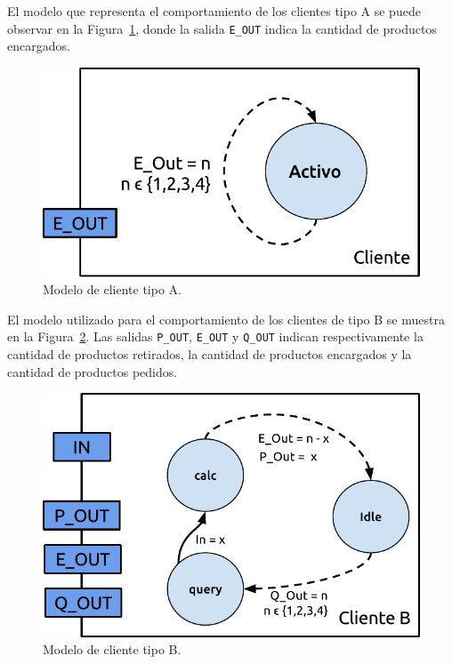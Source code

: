 \documentclass[10pt]{article}
\begin{document}
El modelo que representa el comportamiento de los clientes tipo A se puede observar en la Figura~\ref{fig:fig2}, donde la salida \texttt{E\_OUT} indica la cantidad de productos encargados.

\begin{figure}
\centering
\includegraphics[scale=1]{img/figura2}
\caption{Modelo de cliente tipo A.}
\label{fig:fig2}
\end{figure}

El modelo utilizado para el comportamiento de los clientes de tipo B se muestra en la Figura~\ref{fig:fig3}. Las salidas \texttt{P\_OUT}, \texttt{E\_OUT} y \texttt{Q\_OUT} indican respectivamente la cantidad de productos retirados, la cantidad de productos encargados y la cantidad de productos pedidos.

\begin{figure}
\centering
\includegraphics[scale=1]{img/figura3}
\caption{Modelo de cliente tipo B.}
\label{fig:fig3}
\end{figure}
\end{document}
